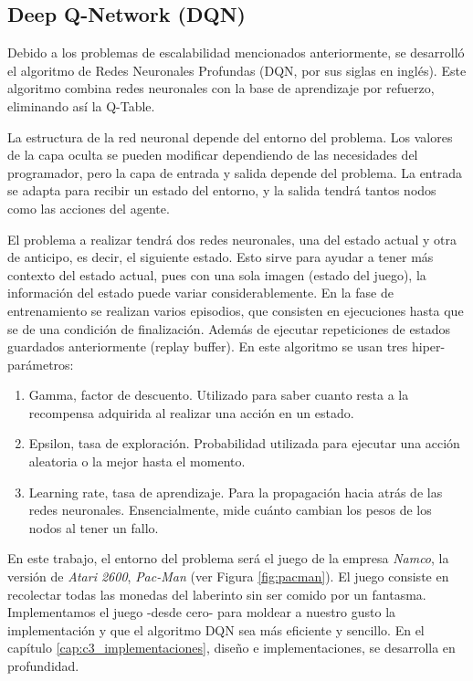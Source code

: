 	\subsection{Deep Q-Network (DQN)}
	\label{cap:2_2_2}
		Debido a los problemas de escalabilidad mencionados anteriormente, se desarrolló el algoritmo de Redes Neuronales Profundas (DQN, por sus siglas en inglés). Este algoritmo combina redes neuronales con la base de aprendizaje por refuerzo, eliminando así la Q-Table.
		
		La estructura de la red neuronal depende del entorno del problema. Los valores de la capa oculta se pueden modificar dependiendo de las necesidades del programador, pero la capa de entrada y salida depende del problema. La entrada se adapta para recibir un estado del entorno, y la salida tendrá tantos nodos como las acciones del agente. 
		
		El problema a realizar tendrá dos redes neuronales, una del estado actual y otra de anticipo, es decir, el siguiente estado. Esto sirve para ayudar a tener más contexto del estado actual, pues con una sola imagen (estado del juego), la información del estado puede variar considerablemente. En la fase de entrenamiento se realizan varios episodios, que consisten en ejecuciones hasta que se de una condición de finalización. Además de ejecutar repeticiones de estados guardados anteriormente (replay buffer). En este algoritmo se usan tres hiper-parámetros: 
		\begin{enumerate}
			\item Gamma, factor de descuento. Utilizado para saber cuanto resta a la recompensa adquirida al realizar una acción en un estado.
			\item Epsilon, tasa de exploración. Probabilidad utilizada para ejecutar una acción aleatoria o la mejor hasta el momento.
			\item Learning rate, tasa de aprendizaje. Para la propagación hacia atrás de las redes neuronales. Ensencialmente, mide cuánto cambian los pesos de los nodos al tener un fallo.
		\end{enumerate}	
		
		
		
		En este trabajo, el entorno del problema será el juego de la empresa \textit{Namco}, la versión de \textit{Atari 2600}, \textit{Pac-Man} (ver Figura \ref{fig:pacman}). El juego consiste en recolectar todas las monedas del laberinto sin ser comido por un fantasma. Implementamos el juego -desde cero- para moldear a nuestro gusto la implementación y que el algoritmo DQN sea más eficiente y sencillo. En el capítulo \ref{cap:c3_implementaciones}, diseño e implementaciones, se desarrolla en profundidad.
		
